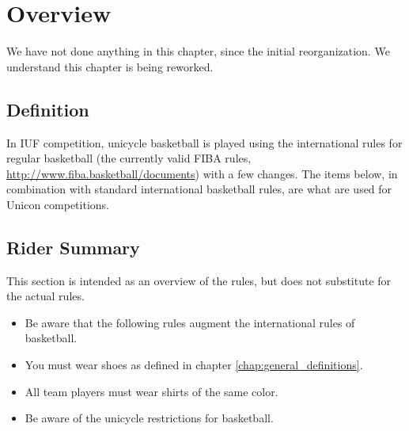 \chapter{Overview}

\begin{comment2016}
We have not done anything in this chapter, since the initial reorganization.
We understand this chapter is being reworked.
\end{comment2016}

\section{Definition}

In IUF competition, unicycle basketball is played using the international rules for regular basketball (the currently valid FIBA rules, \url{http://www.fiba.basketball/documents}) with a few changes.
The items below, in combination with standard international basketball rules, are what are used for Unicon competitions.

\section{Rider Summary}

This section is intended as an overview of the rules, but does not substitute for the actual rules.
\begin{itemize}
\item Be aware that the following rules augment the international rules of basketball.
\item You must wear shoes as defined in chapter \ref{chap:general_definitions}.
\item All team players must wear shirts of the same color.
\item Be aware of the unicycle restrictions for basketball.
\end{itemize}
